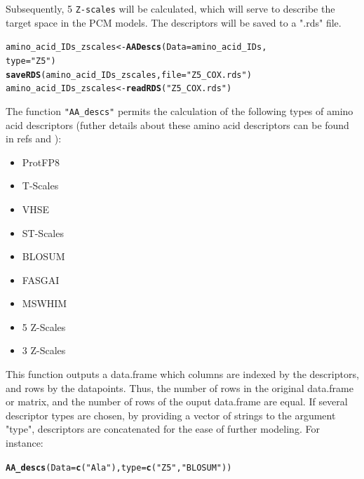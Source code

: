 \documentclass[twoside,a4wide,12pt]{article}\usepackage[]{graphicx}\usepackage[]{color}
\makeatletter
\newcommand{\hlstr}[1]{\textcolor[rgb]{0.192,0.494,0.8}{#1}}%
\newcommand{\hlstd}[1]{\textcolor[rgb]{0.345,0.345,0.345}{#1}}%
\newcommand{\hlkwb}[1]{\textcolor[rgb]{0.69,0.353,0.396}{#1}}%
\newcommand{\hlkwc}[1]{\textcolor[rgb]{0.333,0.667,0.333}{#1}}%
\newcommand{\hlkwd}[1]{\textcolor[rgb]{0.737,0.353,0.396}{\textbf{#1}}}%
\newenvironment{kframe}{%
 \def\at@end@of@kframe{}%
 \ifinner\ifhmode%
  \def\at@end@of@kframe{\end{minipage}}%
  \begin{minipage}{\columnwidth}%
 \fi\fi%
 \def\FrameCommand##1{\hskip\@totalleftmargin \hskip-\fboxsep
 \colorbox{shadecolor}{##1}\hskip-\fboxsep
     \hskip-\linewidth \hskip-\@totalleftmargin \hskip\columnwidth}%
 \MakeFramed {\advance\hsize-\width
   \@totalleftmargin\z@ \linewidth\hsize
   \@setminipage}}%
 {\par\unskip\endMakeFramed%
 \at@end@of@kframe}
\newenvironment{knitrout}{}{} %
\makeatother
\begin{document}
Subsequently, 5 \verb|Z-scales| will be calculated, which will serve to describe the target space in the PCM models.
The descriptors will be saved to a ".rds" file.
\begin{knitrout}
\color{fgcolor}\begin{kframe}
\begin{alltt}
\hlstd{amino_acid_IDs_zscales} \hlkwb{<-} \hlkwd{AADescs}\hlstd{(}\hlkwc{Data} \hlstd{= amino_acid_IDs,}
    \hlkwc{type} \hlstd{=} \hlstr{"Z5"}\hlstd{)}
\hlkwd{saveRDS}\hlstd{(amino_acid_IDs_zscales,} \hlkwc{file} \hlstd{=} \hlstr{"Z5_COX.rds"}\hlstd{)}
\hlstd{amino_acid_IDs_zscales} \hlkwb{<-} \hlkwd{readRDS}\hlstd{(}\hlstr{"Z5_COX.rds"}\hlstd{)}
\end{alltt}
\end{kframe}
\end{knitrout}




The function \verb|"AA_descs"| permits the calculation of the following types of amino acid descriptors (futher details about these amino acid descriptors can be found in refs \cite{AAs1} and \cite{AAs2}):
\begin{itemize}
\item ProtFP8
\item T-Scales
\item VHSE
\item ST-Scales
\item BLOSUM
\item FASGAI
\item MSWHIM
\item 5 Z-Scales
\item 3 Z-Scales
\end{itemize}
This function outputs a data.frame which columns are indexed by the descriptors, and rows by the datapoints. Thus, the number of rows in the original data.frame or matrix, and the number of rows of the ouput data.frame are equal. 
If several descriptor types are chosen, by providing a vector of strings to the argument "type", descriptors are concatenated for the ease of further modeling. 
For instance: 
\begin{knitrout}
\color{fgcolor}\begin{kframe}
\begin{alltt}
\hlkwd{AA_descs}\hlstd{(}\hlkwc{Data} \hlstd{=} \hlkwd{c}\hlstd{(}\hlstr{"Ala"}\hlstd{),} \hlkwc{type} \hlstd{=} \hlkwd{c}\hlstd{(}\hlstr{"Z5"}\hlstd{,} \hlstr{"BLOSUM"}\hlstd{))}
\end{alltt}


{\ttfamily\noindent\bfseries{}}\end{kframe}
\end{knitrout}
\end{document}
